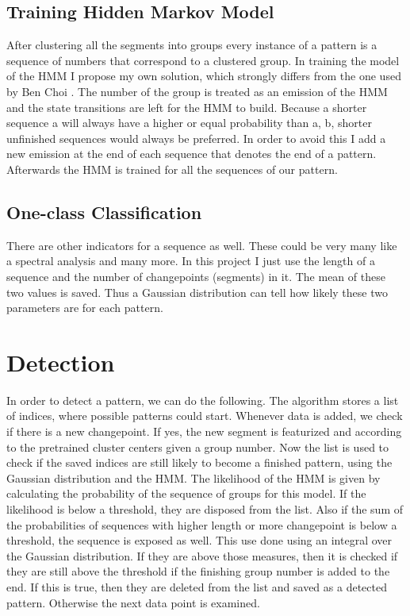 \documentclass{article}
\begin{document}
\subsection{Training Hidden Markov Model}
After clustering all the segments into groups every instance of a pattern is a sequence of numbers that correspond to a clustered group. In training the model of the HMM I propose my own solution, which strongly differs from the one used by Ben Choi \cite{BenChoi}. The number of the group is treated as an emission of the HMM and the state transitions are left for the HMM to build. Because a shorter sequence a will always have a higher or equal probability than {a, b}, shorter unfinished sequences would always be preferred. In order to avoid this I add a new emission at the end of each sequence that denotes the end of a pattern. Afterwards the HMM is trained for all the sequences of our pattern.
\subsection{One-class Classification}
There are other indicators for a sequence as well. These could be very many like a spectral analysis and many more. In this project I just use the length of a sequence and the number of changepoints (segments) in it. The mean of these two values is saved. Thus a Gaussian distribution can tell how likely these two parameters are for each pattern.
\section{Detection}
In order to detect a pattern, we can do the following. The algorithm stores a list of indices, where possible patterns could start. Whenever data is added, we check if there is a new changepoint. If yes, the new segment is featurized and according to the pretrained cluster centers given a group number. Now the list is used to check if the saved indices are still likely to become a finished pattern, using the Gaussian distribution and the HMM. The likelihood of the HMM is given by calculating the probability of the sequence of groups for this model. If the likelihood is below a threshold, they are disposed from the list. Also if the sum of the probabilities of sequences with higher length or more changepoint is below a threshold, the sequence is exposed as well. This use done using an integral over the Gaussian distribution. If they are above those measures, then it is checked if they are still above the threshold if the finishing group number is added to the end. If this is true, then they are deleted from the list and saved as a detected pattern. Otherwise the next data point is examined.
\end{document}
